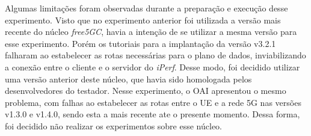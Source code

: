 Algumas limitações foram observadas durante a preparação e execução desse experimento.
Visto que no experimento anterior foi utilizada a versão mais recente do núcleo \textit{free5GC}, havia a intenção de se utilizar a mesma versão para esse experimento. Porém os tutoriais para a implantação da versão v3.2.1 falharam ao estabelecer as rotas necessárias para o plano de dados, inviabilizando a conexão entre o cliente e o servidor do \textit{iPerf}. Desse modo, foi decidido utilizar uma versão anterior deste núcleo, que havia sido homologada pelos desenvolvedores do testador.
Nesse experimento, o OAI apresentou o mesmo problema, com falhas ao estabelecer as rotas entre o UE e a rede 5G nas versões v1.3.0 e v1.4.0, sendo esta a mais recente ate o presente momento. Dessa forma, foi decidido não realizar os experimentos sobre esse núcleo.
